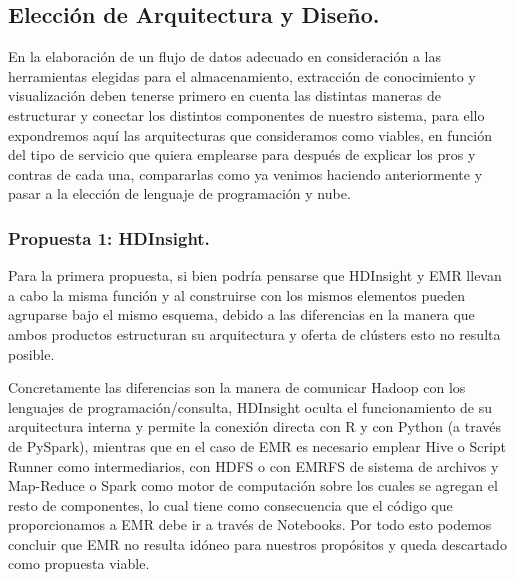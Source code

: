 \documentclass[11pt, a4paper]{article} %
\begin{document}
\subsection{Elección de Arquitectura y Diseño.}
En la elaboración de un flujo de datos adecuado en consideración a las herramientas elegidas para el almacenamiento, extracción de conocimiento y visualización deben tenerse primero en cuenta las distintas maneras de estructurar y conectar los distintos componentes de nuestro sistema, para ello expondremos aquí las arquitecturas que consideramos como viables, en función del tipo de servicio que quiera emplearse para después de explicar los pros y contras de cada una, compararlas como ya venimos haciendo anteriormente y pasar a la elección de lenguaje de programación y nube.
\subsubsection{Propuesta 1: HDInsight.}
Para la primera propuesta, si bien podría pensarse que HDInsight y EMR llevan a cabo la misma función y al construirse con los mismos elementos pueden agruparse bajo el mismo esquema, debido a las diferencias en la manera que ambos productos estructuran su arquitectura y oferta de clústers esto no resulta posible.


Concretamente las diferencias son la manera de comunicar Hadoop con los lenguajes de programación/consulta, HDInsight oculta el funcionamiento de su arquitectura interna y permite la conexión directa con R y con Python (a través de PySpark), mientras que en el caso de EMR es necesario emplear Hive o Script Runner como intermediarios, con HDFS o con EMRFS de sistema de archivos y Map-Reduce o Spark como motor de computación sobre los cuales se agregan el resto de componentes, lo cual tiene como consecuencia que el código que proporcionamos a EMR debe ir a través de Notebooks. Por todo esto podemos concluir que EMR no resulta idóneo para nuestros propósitos y queda descartado como propuesta viable.
\end{document}
